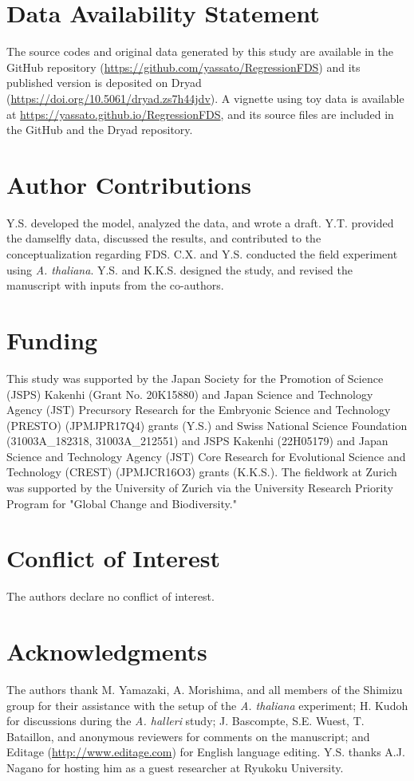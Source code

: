 \documentclass[12pt,]{article}
\begin{document}
\section*{Data Availability Statement}
The source codes and original data generated by this study are available in the GitHub repository (\url{https://github.com/yassato/RegressionFDS}) and its published version is deposited on Dryad (\url{https://doi.org/10.5061/dryad.zs7h44jdv}). A vignette using toy data is available at \url{https://yassato.github.io/RegressionFDS}, and its source files are included in the GitHub and the Dryad repository.

\section*{Author Contributions}
Y.S. developed the model, analyzed the data, and wrote a draft. Y.T. provided the damselfly data, discussed the results, and contributed to the conceptualization regarding FDS. C.X. and Y.S. conducted the field experiment using \textit{A. thaliana}. Y.S. and K.K.S. designed the study, and revised the manuscript with inputs from the co-authors.

\section*{Funding}
This study was supported by the Japan Society for the Promotion of Science (JSPS) Kakenhi (Grant No. 20K15880) and Japan Science and Technology Agency (JST) Precursory Research for the Embryonic Science and Technology (PRESTO) (JPMJPR17Q4) grants (Y.S.) and Swiss National Science Foundation (31003A\_182318, 31003A\_212551) and JSPS Kakenhi (22H05179) and Japan Science and Technology Agency (JST) Core Research for Evolutional Science and
Technology (CREST) (JPMJCR16O3) grants (K.K.S.). The fieldwork at Zurich was supported by the University of Zurich via the University Research Priority Program for "Global Change and Biodiversity."

\section*{Conflict of Interest}
The authors declare no conflict of interest.

\section*{Acknowledgments}
The authors thank M. Yamazaki, A. Morishima, and all members of the Shimizu group for their assistance with the setup of the \textit{A. thaliana} experiment; H. Kudoh for discussions during the \textit{A. halleri} study; J. Bascompte, S.E. Wuest, T. Bataillon, and anonymous reviewers for comments on the manuscript; and Editage (\url{http://www.editage.com}) for English language editing. Y.S. thanks A.J. Nagano for hosting him as a guest researcher at Ryukoku University. 
\end{document}
